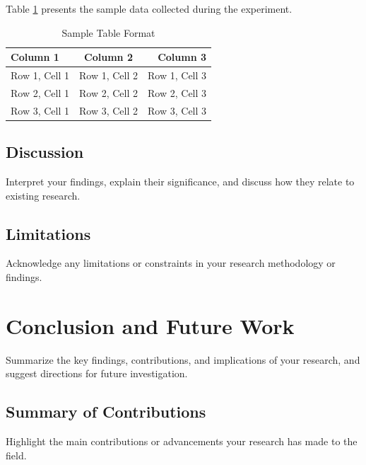 \documentclass[12pt,a4paper]{report}
\begin{document}
\begin{spacing}{1.5}
    Table \ref{tab:sample_table} presents the sample data collected during the experiment.

    \begin{table}[ht]
        \centering
        \caption{Sample Table Format}  %
        \label{tab:sample_table}       %
        \begin{tabular}{|l|c|r|}       %
            \hline
            \textbf{Column 1} & \textbf{Column 2} & \textbf{Column 3} \\
            \hline
            Row 1, Cell 1     & Row 1, Cell 2     & Row 1, Cell 3     \\
            Row 2, Cell 1     & Row 2, Cell 2     & Row 2, Cell 3     \\
            Row 3, Cell 1     & Row 3, Cell 2     & Row 3, Cell 3     \\
            \hline
        \end{tabular}
    \end{table}

    \section{Discussion}
    Interpret your findings, explain their significance, and discuss how they relate to existing research.

    \section{Limitations}
    Acknowledge any limitations or constraints in your research methodology or findings.

    \chapter{Conclusion and Future Work}
    Summarize the key findings, contributions, and implications of your research, and suggest directions for future investigation.

    \section{Summary of Contributions}
    Highlight the main contributions or advancements your research has made to the field.


\end{spacing}
\end{document}
